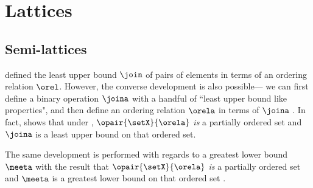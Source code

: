 

\chapter{Lattices}
\label{chp:lattice}

\section{Semi-lattices}

 defined the least upper bound $\join$
of pairs of elements in terms of an ordering relation $\orel$.
However, the converse development is also possible---
we can first define a binary operation $\joina$ with a handful of
``least upper bound like properties", and then define
an ordering relation $\orela$ in terms of $\joina$ .
In fact,  shows that under ,
$\opair{\setX}{\orela}$ \emph{is} a partially ordered set
and $\joina$ is a least upper bound on that ordered set.

The same development is performed with regards to a greatest lower bound $\meeta$
with the result that
$\opair{\setX}{\orela}$ \emph{is} a partially ordered set
and $\meeta$ is a greatest lower bound on that ordered set .


